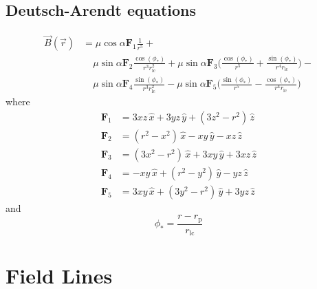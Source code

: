 \documentclass{book}
\newcommand{\F}[1]{\pmb{F}_{#1}}
\newcommand{\ph}{\phi_\ast}
\newcommand{\rL}{r_\text{lc}} %
\newcommand{\rp}{r_\text{p}} %
\begin{document}
\subsection{Deutsch-Arendt equations}

\begin{equation}
\begin{aligned}
    \vec{B}(\vec{r}) &= \mu \cos{\alpha} \F{1} \frac{1}{r^5} + \\
                   &\hspace{13pt} \mu \sin{\alpha} \F{2} \frac{\cos(\ph)}{r^3 \rL^2} +
                                  \mu \sin{\alpha} \F{3} \bigg(\frac{\cos(\ph)}{r^5} + \frac{\sin(\ph)}{r^4 \rL}\bigg) - \\
                   &\hspace{13pt} \mu \sin{\alpha} \F{4} \frac{\sin(\ph)}{r^3 \rL^2} -
                                  \mu \sin{\alpha} \F{5} \bigg(\frac{\sin(\ph)}{r^5} - \frac{\cos(\ph)}{r^4 \rL}\bigg)
\end{aligned}
\end{equation}
where
\begin{equation}
\begin{aligned}
    \F{1} &= 3xz\,\hat{x} + 3yz\,\hat{y} + (3z^2-r^2)\,\hat{z} \\
    \F{2} &= (r^2-x^2)\,\hat{x} - xy\,\hat{y} - xz\,\hat{z} \\
    \F{3} &= (3x^2-r^2)\,\hat{x} + 3xy\,\hat{y} + 3xz\,\hat{z} \\
    \F{4} &= -xy\,\hat{x} + (r^2-y^2)\,\hat{y} - yz\,\hat{z} \\
    \F{5} &= 3xy\,\hat{x} + (3y^2-r^2)\,\hat{y} + 3yz\,\hat{z}
\end{aligned}
\end{equation}
and
\begin{equation}
    \ph = \frac{r - \rp}{\rL}
\end{equation}


\section{Field Lines}
\end{document}
